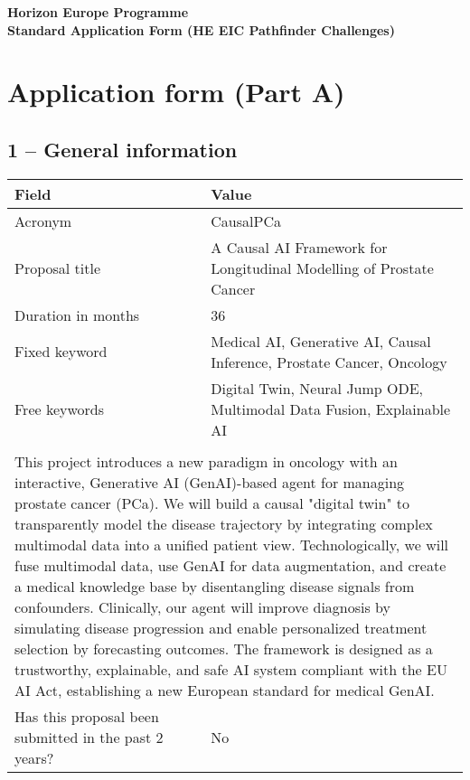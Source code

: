 \documentclass[11pt, a4paper]{article}
\begin{document}
\begin{center}
\huge\bfseries Horizon Europe Programme \\
\Large\bfseries Standard Application Form (HE EIC Pathfinder Challenges)
\end{center}

\section*{Application form (Part A)}

\subsection*{1 – General information}

\begin{tabular}{p{} p{}}
\toprule
\textbf{Field} & \textbf{Value} \\
\midrule
Acronym & CausalPCa \\
Proposal title & A Causal AI Framework for Longitudinal Modelling of Prostate Cancer \\
Duration in months & 36 \\
Fixed keyword & Medical AI, Generative AI, Causal Inference, Prostate Cancer, Oncology \\
Free keywords & Digital Twin, Neural Jump ODE, Multimodal Data Fusion, Explainable AI \\
\addlinespace
\multicolumn{2}{p{\textwidth}}{\textbf{Abstract}} \\
\multicolumn{2}{p{\textwidth}}{This project introduces a new paradigm in oncology with an interactive, Generative AI (GenAI)-based agent for managing prostate cancer (PCa). We will build a causal "digital twin" to transparently model the disease trajectory by integrating complex multimodal data into a unified patient view. Technologically, we will fuse multimodal data, use GenAI for data augmentation, and create a medical knowledge base by disentangling disease signals from confounders. Clinically, our agent will improve diagnosis by simulating disease progression and enable personalized treatment selection by forecasting outcomes. The framework is designed as a trustworthy, explainable, and safe AI system compliant with the EU AI Act, establishing a new European standard for medical GenAI.} \\
\addlinespace
Has this proposal been submitted in the past 2 years? & No \\
\bottomrule
\end{tabular}
\end{document}

